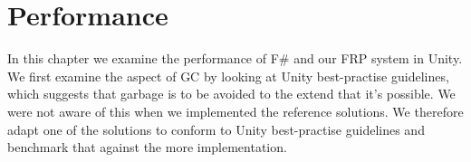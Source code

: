 \section{Performance}
In this chapter we examine the performance of F\# and our \gls{FRP} system in Unity. We first examine the aspect of \gls{GC} by looking at Unity best-practise guidelines, which suggests that garbage is to be avoided to the extend that it's possible. We were not aware of this when we implemented the reference solutions. We therefore adapt one of the solutions to conform to Unity best-practise guidelines and benchmark that against the more  implementation.


